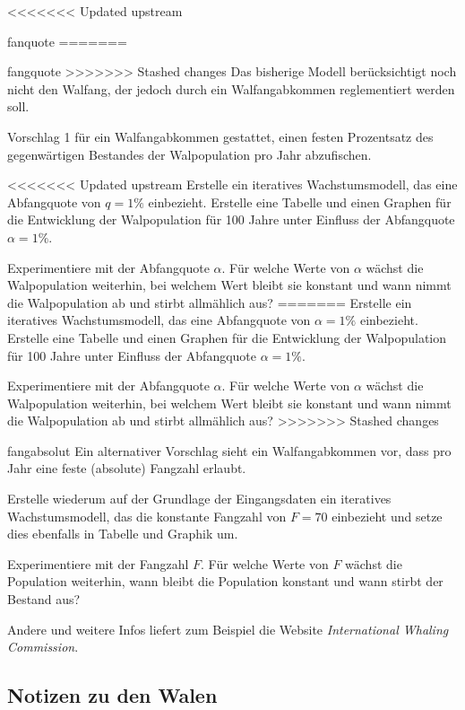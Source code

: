 \documentclass[%
<<<<<<< Updated upstream
<<<<<<< Updated upstream
11pt,%
twoside,%
titlepage,%
german,%
headsepline%
]{scrartcl}
\begin{document}
<<<<<<< Updated upstream
\begin{uebenv}{fanquote}
=======
\begin{uebenv}{fangquote}
>>>>>>> Stashed changes
    Das bisherige Modell berücksichtigt noch nicht den Walfang, der jedoch durch ein Walfangabkommen reglementiert werden soll.

    Vorschlag 1 für ein Walfangabkommen gestattet, einen festen Prozentsatz des gegenwärtigen Bestandes der Walpopulation pro Jahr abzufischen.

<<<<<<< Updated upstream
    Erstelle ein iteratives Wachstumsmodell, das eine Abfangquote von $q=1\%$ einbezieht. Erstelle eine Tabelle und einen Graphen für die Entwicklung der Walpopulation für 100 Jahre unter Einfluss der Abfangquote $\alpha=1\%$.

    Experimentiere mit der Abfangquote $\alpha$. Für welche Werte von $\alpha$ wächst die Walpopulation weiterhin, bei welchem Wert bleibt sie konstant und wann nimmt die Walpopulation ab und stirbt allmählich aus?
=======
    Erstelle ein iteratives Wachstumsmodell, das eine Abfangquote von $\alpha=1\%$ einbezieht. Erstelle eine Tabelle und einen Graphen für die Entwicklung der Walpopulation für 100 Jahre unter Einfluss der Abfangquote $\alpha=1\%$.

Experimentiere mit der Abfangquote $\alpha$. Für welche Werte von $\alpha$ wächst die Walpopulation weiterhin, bei welchem Wert bleibt sie konstant und wann nimmt die Walpopulation ab und stirbt allmählich aus?
>>>>>>> Stashed changes
\end{uebenv}

\begin{uebenv}{fangabsolut}
    Ein alternativer Vorschlag sieht ein Walfangabkommen vor, dass pro Jahr eine feste (absolute) Fangzahl erlaubt.

    Erstelle wiederum auf der Grundlage der Eingangsdaten ein iteratives Wachstumsmodell, das die konstante Fangzahl von $F=70$ einbezieht und setze dies ebenfalls in Tabelle und Graphik um.

Experimentiere mit der Fangzahl $F$. Für welche Werte von $F$ wächst die Population weiterhin, wann bleibt die Population konstant und wann stirbt der Bestand aus?
\end{uebenv}

Andere und weitere Infos liefert zum Beispiel die Website \emph{International Whaling Commission}.

\clearpage

\subsection{Notizen zu den Walen}


\end{uebenv}
\end{document}
